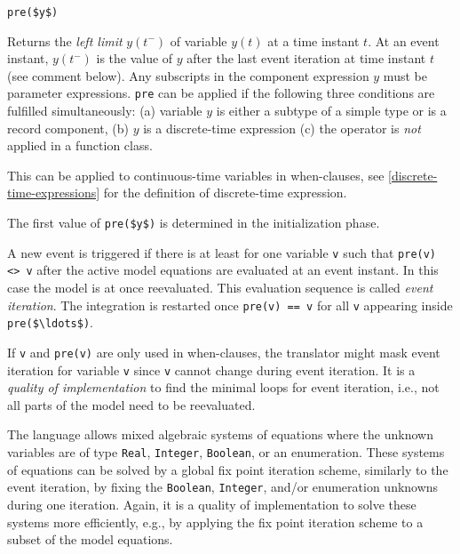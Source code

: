 \begin{operatordefinition}[pre]
\begin{synopsis}\begin{lstlisting}
pre($y$)
\end{lstlisting}\end{synopsis}
\begin{semantics}
Returns the \emph{left limit} $y(t^{-})$ of variable $y(t)$ at a time instant $t$.  At an event instant, $y(t^{-})$ is the value of $y$ after the last event iteration at time instant $t$ (see comment below). Any subscripts in the component expression $y$ must be parameter expressions.  \lstinline!pre! can be applied if the following three conditions are fulfilled simultaneously: (a) variable $y$ is either a subtype of a simple type or is a record component, (b) $y$ is a discrete-time expression (c) the operator is \emph{not} applied in a function class.
\begin{nonnormative}
This can be applied to continuous-time variables in when-clauses, see \cref{discrete-time-expressions} for the definition of discrete-time expression.
\end{nonnormative}
The first value of \lstinline!pre($y$)! is determined in the initialization phase.

A new event is triggered if there is at least for one variable \lstinline!v! such that \lstinline!pre(v) <> v! after the active model equations are evaluated at an event instant.  In this case the model is at once reevaluated.  This evaluation sequence is called \emph{event iteration}.  The integration is restarted once \lstinline!pre(v) == v! for all \lstinline!v! appearing inside \lstinline!pre($\ldots$)!.

\begin{nonnormative}
If \lstinline!v! and \lstinline!pre(v)! are only used in when-clauses, the translator might mask event iteration for variable \lstinline!v! since \lstinline!v! cannot change during event iteration.  It is a \emph{quality of implementation} to find the minimal loops for event iteration, i.e., not all parts of the model need to be reevaluated.

The language allows mixed algebraic systems of equations where the unknown variables are of type \lstinline!Real!, \lstinline!Integer!, \lstinline!Boolean!, or an enumeration.  These systems of equations can be solved by a global fix point iteration scheme, similarly to the event iteration, by fixing the \lstinline!Boolean!, \lstinline!Integer!, and/or enumeration unknowns during one iteration.  Again, it is a quality of implementation to solve these systems more efficiently, e.g., by applying the fix point iteration scheme to a subset of the model equations.
\end{nonnormative}
\end{semantics}
\end{operatordefinition}

